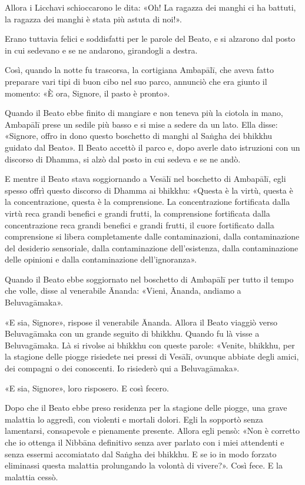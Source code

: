 Allora i Licchavi schioccarono le dita: «Oh! La ragazza dei manghi ci ha
battuti, la ragazza dei manghi è stata più astuta di noi!».

Erano tuttavia felici e soddisfatti per le parole del Beato, e si alzarono dal
posto in cui sedevano e se ne andarono, girandogli a destra.

Così, quando la notte fu trascorsa, la cortigiana Ambapālī, che aveva fatto
preparare vari tipi di buon cibo nel suo parco, annunciò che era giunto il
momento: «È ora, Signore, il pasto è pronto».

Quando il Beato ebbe finito di mangiare e non teneva più la ciotola in mano,
Ambapālī prese un sedile più basso e si mise a sedere da un lato. Ella disse:
«Signore, offro in dono questo boschetto di manghi al Saṅgha dei bhikkhu guidato
dal Beato». Il Beato accettò il parco e, dopo averle dato istruzioni con un
discorso di Dhamma, si alzò dal posto in cui sedeva e se ne andò.

E mentre il Beato stava soggiornando a Vesālī nel boschetto di Ambapālī, egli
spesso offrì questo discorso di Dhamma ai bhikkhu: «Questa è la virtù, questa è
la concentrazione, questa è la comprensione. La concentrazione fortificata dalla
virtù reca grandi benefici e grandi frutti, la comprensione fortificata dalla
concentrazione reca grandi benefici e grandi frutti, il cuore fortificato dalla
comprensione si libera completamente dalle contaminazioni, dalla contaminazione
del desiderio sensoriale, dalla contaminazione dell’esistenza, dalla
contaminazione delle opinioni e dalla contaminazione dell’ignoranza».


Quando il Beato ebbe soggiornato nel boschetto di Ambapālī per tutto il tempo
che volle, disse al venerabile Ānanda: «Vieni, Ānanda, andiamo a Beluvagāmaka».

«E sia, Signore», rispose il venerabile Ānanda. Allora il Beato viaggiò verso
Beluvagāmaka con un grande seguito di bhikkhu. Quando fu là visse a
Beluvagāmaka. Là si rivolse ai bhikkhu con queste parole: «Venite, bhikkhu, per
la stagione delle piogge risiedete nei pressi di Vesālī, ovunque abbiate degli
amici, dei compagni o dei conoscenti. Io risiederò qui a Beluvagāmaka».

«E sia, Signore», loro risposero. E così fecero.

Dopo che il Beato ebbe preso residenza per la stagione delle piogge, una grave
malattia lo aggredì, con violenti e mortali dolori. Egli la sopportò senza
lamentarsi, consapevole e pienamente presente. Allora egli pensò: «Non è
corretto che io ottenga il Nibbāna definitivo senza aver parlato con i miei
attendenti e senza essermi accomiatato dal Saṅgha dei bhikkhu. E se io in modo
forzato eliminassi questa malattia prolungando la volontà di vivere?». Così
fece. E la malattia cessò.

